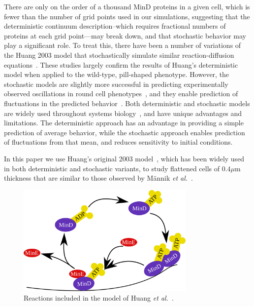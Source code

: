 \documentclass[10pt,letterpaper]{article}
\newcommand\micron{\ensuremath{\mu\text{m}}}
\begin{document}
There are only on the order of a thousand MinD proteins in a given
cell, which is fewer than the number of grid points used in our
simulations, suggesting that the deterministic continuum
description--which requires fractional numbers of proteins at each
grid point---may break down, and that stochastic behavior may play a
significant role.  To treat this, there have been a number of
variations of the Huang 2003 model that stochastically simulate
similar reaction-diffusion equations~\cite{fange2006noise,
  kerr2006division}.  These studies largely confirm the results of
Huang's deterministic model when applied to the wild-type, pill-shaped
phenotype.  However, the stochastic models are slightly more
successful in predicting experimentally observed oscillations in round
cell phenotypes~\cite{fange2006noise, huang2004min}, and they enable
prediction of fluctuations in the predicted
behavior~\cite{kruse2007experimentalist}.  Both deterministic and
stochastic models are widely used throughout systems
biology~\cite{lawson2013spatial, robb2014stochastic,
  oguz2014stochastic, fu2013deterministic, rudiger2014stochastic}, and
have unique advantages and limitations.  The deterministic approach
has an advantage in providing a simple prediction of average behavior,
while the stochastic approach enables prediction of fluctuations from
that mean, and reduces sensitivity to initial conditions.

In this paper we use Huang's original 2003
model~\cite{huang2003dynamic}, which has been widely
used~\cite{hattne2005stochastic,huang2004min,kerr2006division} in both
deterministic and stochastic variants, to study flattened cells of
$0.4\micron$ thickness that are similar to those observed by M\"annik
\emph{et al.}~\cite{mannik2009bacterial}.

\begin{figure}
  \includegraphics[width=8.7cm]{reactions}
  \caption{Reactions included in the model of Huang \emph{et
      al.}~\cite{huang2003dynamic}.}\label{fig:reactions}
\end{figure}
\end{document}
